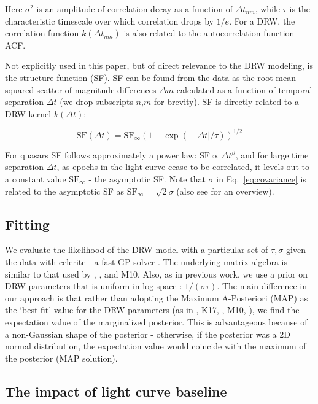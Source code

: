 \documentclass[twocolumn]{aastex62}
\newcommand{\project}[1]{\textsf{#1}}
\begin{document}
Here $\sigma^{2}$ is an amplitude of correlation decay as a function of $\Delta t_{nm}$,  while $\tau$ is the characteristic timescale over which correlation drops by $1/e$. For a DRW,  the correlation function $k(\Delta t_{nm})$ is also related to the autocorrelation function ACF. 

Not explicitly used in this paper, but of direct relevance to the DRW modeling, is the structure function (SF). SF can be found from the data as the root-mean-squared scatter of  magnitude differences $\Delta m$  calculated as a function of temporal separation $\Delta t$ (we drop subscripts $n$,$m$ for brevity). SF is directly related to a DRW kernel $k(\Delta t)$:

\begin{equation}
\mathrm{SF}(\Delta t) = \mathrm{SF}_{\infty} (1-\exp{(-|\Delta t|/\tau)})^{1/2}
\end{equation}

For quasars SF follows approximately a power law: $\mathrm{SF} \propto \Delta t^{\beta}$,  and for large time separation $\Delta t$, as epochs in the light curve cease to be correlated, it levels out to a constant value $\mathrm{SF}_{\infty}$ - the asymptotic SF.  Note that $\sigma$ in Eq.~\ref{eq:covariance} is related to the asymptotic SF as $\mathrm{SF}_\infty = \sqrt{2} \sigma$ (also see \citet{macleod2012, bauer2009, graham2015a} for an overview).


\subsection{Fitting}
We evaluate the likelihood of the DRW model with a particular set of $\tau,\sigma$ given the data with \project{celerite}  - a fast GP solver \citep{foreman2017}. The underlying matrix algebra is similar to that used by \cite{rybicki1992}, \cite{kozlowski2010}, and M10. Also, as in previous work, we use a prior on DRW parameters that is  uniform  in log space :  $1 / (\sigma \tau)$. The main difference in our approach is that rather than adopting the Maximum A-Posteriori (MAP) as the `best-fit' value for the DRW parameters (as in \citealt{kozlowski2010}, K17, \citealt{kozlowski2016b}, M10, \citealt{macleod2011}),  we find the expectation value of the marginalized posterior. This is advantageous because of a non-Gaussian shape of the posterior - otherwise, if the posterior was a 2D normal distribution, the expectation value would coincide with the maximum of the posterior (MAP solution). 

\subsection{The impact of light curve baseline}\label{sec:baseline}
\end{document}
